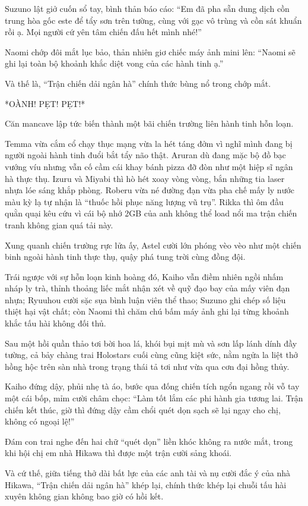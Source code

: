 \documentclass[../main.tex]{subfiles}
\begin{document}
Suzuno lật giở cuốn sổ tay, bình thản báo cáo: ``Em đã pha sẵn dung dịch cồn trung hòa gốc este để tẩy sơn trên tường, cùng với gạc vô trùng và cồn sát khuẩn rồi ạ. Mọi người cứ yên tâm chiến đấu hết mình nhé!''

Naomi chớp đôi mắt lục bảo, thản nhiên giơ chiếc máy ảnh mini lên: ``Naomi sẽ ghi lại toàn bộ khoảnh khắc diệt vong của các hành tinh ạ.''

Và thế là, ``Trận chiến dải ngân hà'' chính thức bùng nổ trong chớp mắt.

*OÀNH! PẸT! PẸT!*

Căn mancave lập tức biến thành một bãi chiến trường liên hành tinh hỗn loạn.

Temma vừa cắm cổ chạy thục mạng vừa la hét táng đởm vì nghĩ mình đang bị người ngoài hành tinh đuổi bắt tẩy não thật. Aruran dù đang mặc bộ đồ bạc vướng víu nhưng vẫn cố cầm cái khay bánh pizza đỡ đòn như một hiệp sĩ ngân hà thực thụ. Izuru và Miyabi thì hò hét xoay vòng vòng, bắn những tia laser nhựa lóe sáng khắp phòng. Roberu vừa né đường đạn vừa pha chế mấy ly nước màu kỳ lạ tự nhận là ``thuốc hồi phục năng lượng vũ trụ''. Rikka thì ôm đầu quằn quại kêu cứu vì cái bộ nhớ 2GB của anh không thể load nổi ma trận chiến tranh không gian quá tải này.

Xung quanh chiến trường rực lửa ấy, Astel cười lớn phóng vèo vèo như một chiến binh ngoài hành tinh thực thụ, quậy phá tung trời cùng đồng đội.

Trái ngược với sự hỗn loạn kinh hoàng đó, Kaiho vẫn điềm nhiên ngồi nhấm nháp ly trà, thỉnh thoảng liếc mắt nhận xét về quỹ đạo bay của mấy viên đạn nhựa; Ryuuhou cười sặc sụa bình luận viên thể thao; Suzuno ghi chép số liệu thiệt hại vật chất; còn Naomi thì chăm chú bấm máy ảnh ghi lại từng khoảnh khắc tấu hài không đối thủ.

Sau một hồi quần thảo tơi bời hoa lá, khói bụi mịt mù và sơn lấp lánh dính đầy tường, cả bảy chàng trai Holostars cuối cùng cũng kiệt sức, nằm ngửa la liệt thở hồng hộc trên sàn nhà trong trạng thái tả tơi như vừa qua cơn đại hồng thủy.

Kaiho đứng dậy, phủi nhẹ tà áo, bước qua đống chiến tích ngổn ngang rồi vỗ tay một cái bốp, mỉm cười châm chọc: ``Làm tốt lắm các phi hành gia tương lai. Trận chiến kết thúc, giờ thì đứng dậy cầm chổi quét dọn sạch sẽ lại ngay cho chị, không có ngoại lệ!''

Đám con trai nghe đến hai chữ ``quét dọn'' liền khóc không ra nước mắt, trong khi hội chị em nhà Hikawa thì được một trận cười sảng khoái.

Và cứ thế, giữa tiếng thở dài bất lực của các anh tài và nụ cười đắc ý của nhà Hikawa, ``Trận chiến dải ngân hà'' khép lại, chính thức khép lại chuỗi tấu hài xuyên không gian không bao giờ có hồi kết.
\end{document}
